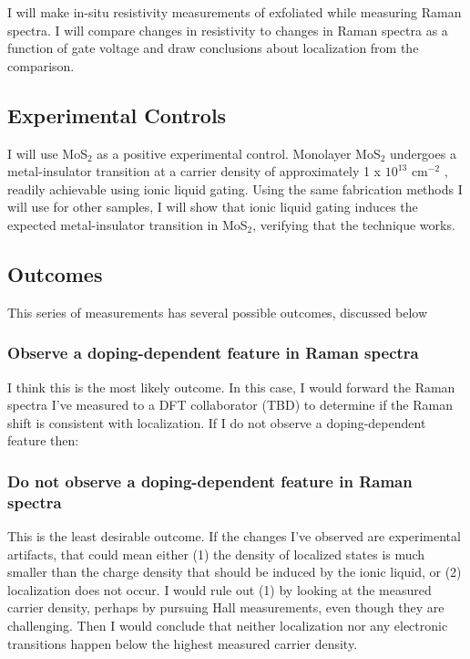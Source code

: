 \documentclass[11pt]{article}
\begin{document}
I will make in-situ resistivity measurements of exfoliated \rucl while measuring Raman spectra. I will compare changes in resistivity to changes in Raman spectra as a function of gate voltage and draw conclusions about localization from the comparison.

\subsection{Experimental Controls}

I will use MoS$_{2}$ as a positive experimental control. Monolayer MoS$_{2}$ undergoes a metal-insulator transition at a carrier density of approximately 1 x $10^{13}$ cm$^{-2}$ \cite{Radisavljevic2013}, readily achievable using ionic liquid gating. Using the same fabrication methods I will use for other samples, I will show that ionic liquid gating induces the expected metal-insulator transition in MoS$_{2}$, verifying that the technique works.

\subsection{Outcomes}

This series of measurements has several possible outcomes, discussed below

\subsubsection{Observe a doping-dependent feature in Raman spectra}
I think this is the most likely outcome. In this case, I would forward the Raman spectra I've measured to a DFT collaborator (TBD) to determine if the Raman shift is consistent with localization. If I do not observe a doping-dependent feature then:

\subsubsection{Do not observe a doping-dependent feature in Raman spectra}
This is the least desirable outcome. If the changes I've observed are experimental artifacts, that could mean either (1) the density of localized states is much smaller than the charge density that should be induced by the ionic liquid, or (2) localization does not occur. I would rule out (1) by looking at the measured carrier density, perhaps by pursuing Hall measurements, even though they are challenging. Then I would conclude that neither localization nor any electronic transitions happen below the highest measured carrier density.
\end{document}
